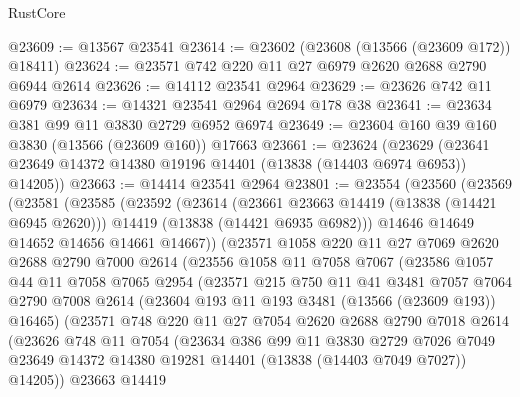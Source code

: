 \begin{lexlean}{RustCore}
\begin{coremodule}
@23609 := @13567 @23541
@23614 := @23602 (@23608 (@13566 (@23609 @172)) @18411)
@23624 := @23571 @742 @220 @11 @27 @6979 @2620 @2688 @2790 @6944 @2614
@23626 := @14112 @23541 @2964
@23629 := @23626 @742 @11 @6979
@23634 := @14321 @23541 @2964 @2694 @178 @38
@23641 := @23634 @381 @99 @11 @3830 @2729 @6952 @6974
@23649 := @23604 @160 @39 @160 @3830 (@13566 (@23609 @160)) @17663
@23661 := @23624
    (@23629 (@23641 @23649 @14372 @14380 @19196 @14401 (@13838 (@14403 @6974 @6953)) @14205))
@23663 := @14414 @23541 @2964
@23801 := @23554
    (@23560
      (@23569
        (@23581
          (@23585
            (@23592
              (@23614
                (@23661 @23663 @14419 (@13838 (@14421 @6945 @2620)))
                @14419
                (@13838 (@14421 @6935 @6982)))
              @14646
              @14649
              @14652
              @14656
              @14661
              @14667))
          (@23571
            @1058
            @220
            @11
            @27
            @7069
            @2620
            @2688
            @2790
            @7000
            @2614
            (@23556
              @1058
              @11
              @7058
              @7067
              (@23586
                @1057
                @44
                @11
                @7058
                @7065
                @2954
                (@23571
                  @215
                  @750
                  @11
                  @41
                  @3481
                  @7057
                  @7064
                  @2790
                  @7008
                  @2614
                  (@23604 @193 @11 @193 @3481 (@13566 (@23609 @193)) @16465)
                  (@23571
                    @748
                    @220
                    @11
                    @27
                    @7054
                    @2620
                    @2688
                    @2790
                    @7018
                    @2614
                    (@23626
                      @748
                      @11
                      @7054
                      (@23634
                        @386
                        @99
                        @11
                        @3830
                        @2729
                        @7026
                        @7049
                        @23649
                        @14372
                        @14380
                        @19281
                        @14401
                        (@13838 (@14403 @7049 @7027))
                        @14205))
                    @23663
                    @14419

\end{coremodule}
\end{lexlean}
